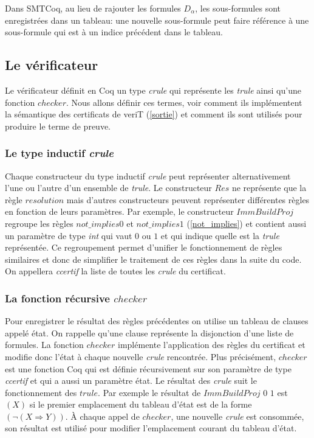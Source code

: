 \documentclass[11pt]{article}
\begin{document}
Dans SMTCoq, au lieu de rajouter les formules $D_\alpha$, les sous-formules sont enregistrées dans un tableau: une nouvelle sous-formule peut faire référence à une sous-formule qui est à un indice précédent dans le tableau. 

\subsection{Le vérificateur}

Le vérificateur définit en Coq un type \textit{crule} qui représente les \textit{trule} ainsi qu'une fonction $checker$. Nous allons définir ces termes, voir comment ils implémentent la sémantique des certificats de veriT (\ref{sortie}) et comment ils sont utilisés pour produire le terme de preuve.


\subsubsection{Le type inductif \textit{crule}}\label{regroupement}


Chaque constructeur du type inductif \textit{crule} peut représenter alternativement l'une ou l'autre d'un ensemble de \textit{trule}. Le constructeur $Res$ ne représente que la règle $resolution$ mais d'autres constructeurs peuvent représenter différentes règles en fonction de leurs paramètres. Par exemple, le constructeur $ImmBuildProj$ regroupe les règles $not\_implies0$ et $not\_implies1$ (\ref{not_implies}) et contient aussi un paramètre de type \textit{int} qui vaut $0$ ou $1$ et qui indique quelle est la \textit{trule} représentée. Ce regroupement permet d'unifier le fonctionnement de règles similaires et donc de simplifier le traitement de ces règles dans la suite du code. \\

On appellera \textit{ccertif} la liste de toutes les \textit{crule} du certificat.


\subsubsection{La fonction récursive $checker$} \label{checker}

Pour enregistrer le résultat des règles précédentes on utilise un tableau de clauses appelé état. On rappelle qu'une clause représente la disjonction d'une liste de formules. La fonction $checker$ implémente l'application des règles du certificat et modifie donc l'état à chaque nouvelle \textit{crule} rencontrée. Plus précisément, $checker$ est une fonction Coq qui est définie récursivement sur son paramètre de type \textit{ccertif} et qui a aussi un paramètre état. Le résultat des \textit{crule} suit le fonctionnement des $trule$. Par exemple le résultat de $ImmBuildProj \,\, 0 \,\, 1$ est $(X)$ si le premier emplacement du tableau d'état est de la forme $(\neg (X \Rightarrow Y))$. À chaque appel de $checker$, une nouvelle \textit{crule} est consommée, son résultat est utilisé pour modifier l'emplacement courant du tableau d'état.\\
\end{document}
